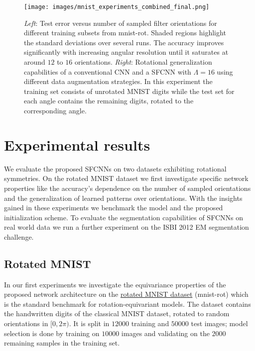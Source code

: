 \documentclass[10pt,twocolumn,letterpaper]{article}
\begin{document}
\begin{figure*}[!ht]
	\centering
	\texttt{[image: images/mnist\_experiments\_combined\_final.png]}
	\vspace{-3.5ex}
	\caption{
		\emph{Left}:
		Test error versus number of sampled filter orientations for different training subsets from mnist-rot.
		Shaded regions highlight the standard deviations over several runs.
		The accuracy improves significantly with increasing angular resolution until it saturates at around $12$ to $16$ orientations.
		\emph{Right}:
		Rotational generalization capabilities of a conventional CNN and a \mbox{SFCNN} with $\Lambda=16$ using different data augmentation strategies.
		In this experiment the training set consists of unrotated MNIST digits while the test set for each angle contains the remaining digits, rotated to the corresponding angle.
		}
	\label{fig:mnist_experiments_combined}
	\vspace{-2ex}
\end{figure*}


\section{Experimental results}

We evaluate the proposed \mbox{SFCNNs} on two datasets exhibiting rotational symmetries.
On the rotated MNIST dataset we first investigate specific network properties like the accuracy's dependence on the number of sampled orientations and the generalization of learned patterns over orientations.
With the insights gained in these experiments we benchmark the model and the proposed initialization scheme.
To evaluate the segmentation capabilities of \mbox{SFCNNs} on real world data we run a further experiment on the ISBI 2012 EM segmentation challenge.


\subsection{Rotated MNIST}

In our first experiments we investigate the equivariance properties of the proposed network architecture on the
\href{http://www.iro.umontreal.ca/~lisa/twiki/bin/view.cgi/Public/MnistVariations}{rotated MNIST dataset}
(mnist-rot) which is the standard benchmark for rotation-equivariant models.
The dataset contains the handwritten digits of the classical MNIST dataset, rotated to random orientations in $[0,2\pi)$.
It is split in $12000$ training and $50000$ test images; model selection is done by training on $10000$ images and validating on the $2000$ remaining samples in the training set.
\end{document}
